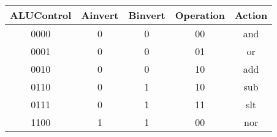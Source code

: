 \begin{tabular}[t]{c|ccc|c}
	\toprule
	ALUControl & Ainvert & Binvert & Operation & Action \\
	\midrule
	{0000}     & 0       & 0       & 00        & and    \\
	{0001}     & 0       & 0       & 01        & or     \\
	{0010}     & 0       & 0       & 10        & add    \\
	{0110}     & 0       & 1       & 10        & sub    \\
	{0111}     & 0       & 1       & 11        & slt    \\
	{1100}     & 1       & 1       & 00        & nor    \\
	\bottomrule
\end{tabular}
